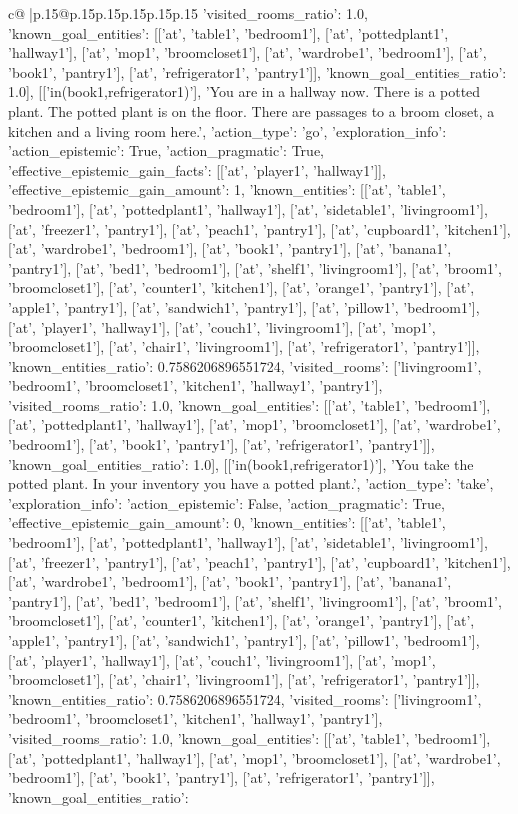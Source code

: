 \documentclass{article}
\begin{document}
{\begin{supertabular}{c@{$\;$}|p{.15\linewidth}@{}p{.15\linewidth}p{.15\linewidth}p{.15\linewidth}p{.15\linewidth}p{.15\linewidth}}
{{{'visited_rooms_ratio': 1.0, 'known_goal_entities': [['at', 'table1', 'bedroom1'], ['at', 'pottedplant1', 'hallway1'], ['at', 'mop1', 'broomcloset1'], ['at', 'wardrobe1', 'bedroom1'], ['at', 'book1', 'pantry1'], ['at', 'refrigerator1', 'pantry1']], 'known_goal_entities_ratio': 1.0}}], [['in(book1,refrigerator1)'], 'You are in a hallway now. There is a potted plant. The potted plant is on the floor. There are passages to a broom closet, a kitchen and a living room here.', {'action_type': 'go', 'exploration_info': {'action_epistemic': True, 'action_pragmatic': True, 'effective_epistemic_gain_facts': [['at', 'player1', 'hallway1']], 'effective_epistemic_gain_amount': 1, 'known_entities': [['at', 'table1', 'bedroom1'], ['at', 'pottedplant1', 'hallway1'], ['at', 'sidetable1', 'livingroom1'], ['at', 'freezer1', 'pantry1'], ['at', 'peach1', 'pantry1'], ['at', 'cupboard1', 'kitchen1'], ['at', 'wardrobe1', 'bedroom1'], ['at', 'book1', 'pantry1'], ['at', 'banana1', 'pantry1'], ['at', 'bed1', 'bedroom1'], ['at', 'shelf1', 'livingroom1'], ['at', 'broom1', 'broomcloset1'], ['at', 'counter1', 'kitchen1'], ['at', 'orange1', 'pantry1'], ['at', 'apple1', 'pantry1'], ['at', 'sandwich1', 'pantry1'], ['at', 'pillow1', 'bedroom1'], ['at', 'player1', 'hallway1'], ['at', 'couch1', 'livingroom1'], ['at', 'mop1', 'broomcloset1'], ['at', 'chair1', 'livingroom1'], ['at', 'refrigerator1', 'pantry1']], 'known_entities_ratio': 0.7586206896551724, 'visited_rooms': ['livingroom1', 'bedroom1', 'broomcloset1', 'kitchen1', 'hallway1', 'pantry1'], 'visited_rooms_ratio': 1.0, 'known_goal_entities': [['at', 'table1', 'bedroom1'], ['at', 'pottedplant1', 'hallway1'], ['at', 'mop1', 'broomcloset1'], ['at', 'wardrobe1', 'bedroom1'], ['at', 'book1', 'pantry1'], ['at', 'refrigerator1', 'pantry1']], 'known_goal_entities_ratio': 1.0}}], [['in(book1,refrigerator1)'], 'You take the potted plant. In your inventory you have a potted plant.', {'action_type': 'take', 'exploration_info': {'action_epistemic': False, 'action_pragmatic': True, 'effective_epistemic_gain_amount': 0, 'known_entities': [['at', 'table1', 'bedroom1'], ['at', 'pottedplant1', 'hallway1'], ['at', 'sidetable1', 'livingroom1'], ['at', 'freezer1', 'pantry1'], ['at', 'peach1', 'pantry1'], ['at', 'cupboard1', 'kitchen1'], ['at', 'wardrobe1', 'bedroom1'], ['at', 'book1', 'pantry1'], ['at', 'banana1', 'pantry1'], ['at', 'bed1', 'bedroom1'], ['at', 'shelf1', 'livingroom1'], ['at', 'broom1', 'broomcloset1'], ['at', 'counter1', 'kitchen1'], ['at', 'orange1', 'pantry1'], ['at', 'apple1', 'pantry1'], ['at', 'sandwich1', 'pantry1'], ['at', 'pillow1', 'bedroom1'], ['at', 'player1', 'hallway1'], ['at', 'couch1', 'livingroom1'], ['at', 'mop1', 'broomcloset1'], ['at', 'chair1', 'livingroom1'], ['at', 'refrigerator1', 'pantry1']], 'known_entities_ratio': 0.7586206896551724, 'visited_rooms': ['livingroom1', 'bedroom1', 'broomcloset1', 'kitchen1', 'hallway1', 'pantry1'], 'visited_rooms_ratio': 1.0, 'known_goal_entities': [['at', 'table1', 'bedroom1'], ['at', 'pottedplant1', 'hallway1'], ['at', 'mop1', 'broomcloset1'], ['at', 'wardrobe1', 'bedroom1'], ['at', 'book1', 'pantry1'], ['at', 'refrigerator1', 'pantry1']], 'known_goal_entities_ratio': }}}
\end{supertabular}}
\end{document}
